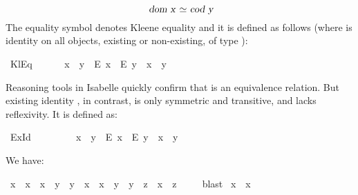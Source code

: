 \begin{isabellebody}
\begin{isamarkuptext}
\[\isa{dom\ x\ {\isasymsimeq}\ cod\ y}\] 
The equality symbol \isa{{\isasymcong}} denotes Kleene equality and it
is defined as follows (where \isa{{\isacharequal}} is identity on all objects, existing or non-existing, 
of type ):%
\end{isamarkuptext}\isamarkuptrue%
\isamarkupfalse%
\ KlEq\ {\isacharparenleft}\ {\isachardoublequoteopen}{\isasymcong}{\isachardoublequoteclose}\ {}{}{\isacharparenright}\ %
\isanewline
\ \ {\isachardoublequoteopen}x\ {\isasymcong}\ y\ {\isasymequiv}\ {\isacharparenleft}E\ x\ \isactrlbold {\isasymor}\ E\ y{\isacharparenright}\ \isactrlbold {\isasymrightarrow}\ x\ \isactrlbold {\isacharequal}\ y{\isachardoublequoteclose}%
\begin{isamarkuptext}%
Reasoning tools in Isabelle quickly confirm that \isa{{\isasymcong}} is an equivalence relation. 
But existing identity \isa{{\isasymsimeq}}, in contrast, is only symmetric and transitive, and lacks 
reflexivity. It is defined as:%
\end{isamarkuptext}\isamarkuptrue%
\isamarkupfalse%
\ ExId\ {\isacharparenleft}\ {\isachardoublequoteopen}{\isasymsimeq}{\isachardoublequoteclose}\ {}{}{\isacharparenright}\ %
\ \ \isanewline
\ \ {\isachardoublequoteopen}x\ {\isasymsimeq}\ y\ {\isasymequiv}\ E\ x\ \isactrlbold {\isasymand}\ E\ y\ \isactrlbold {\isasymand}\ x\ \isactrlbold {\isacharequal}\ y{\isachardoublequoteclose}%
\begin{isamarkuptext}%
We have:%
\end{isamarkuptext}\isamarkuptrue%
\isamarkupfalse%
\ {\isachardoublequoteopen}x\ {\isasymcong}\ x\ \isactrlbold {\isasymand}\ {\isacharparenleft}x\ {\isasymcong}\ y\ \isactrlbold {\isasymrightarrow}\ y\ {\isasymcong}\ x{\isacharparenright}\ \isactrlbold {\isasymand}\ {\isacharparenleft}{\isacharparenleft}x\ {\isasymcong}\ y\ \isactrlbold {\isasymand}\ y\ {\isasymcong}\ z{\isacharparenright}\ \isactrlbold {\isasymrightarrow}\ x\ {\isasymcong}\ z{\isacharparenright}{\isachardoublequoteclose}\ \isanewline
%
\isadelimproof
\ \ %
\endisadelimproof
%
\isatagproof
{}\isamarkupfalse%
\ blast%
\endisatagproof
{\isafoldproof}%
%
\isadelimproof
\isanewline
%
\endisadelimproof
{}\isamarkupfalse%
\ {\isachardoublequoteopen}x\ {\isasymsimeq}\ x{\isachardoublequoteclose}\ %
\end{isabellebody}
